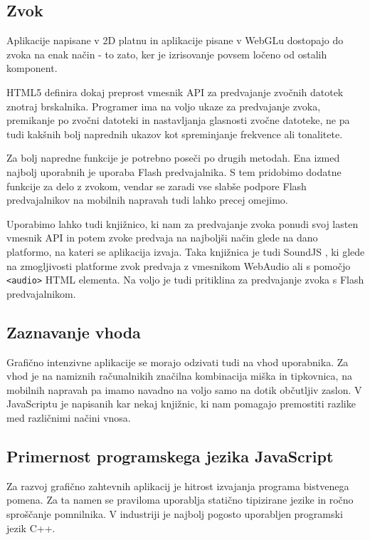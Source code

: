 \subsection{Zvok}

Aplikacije napisane v 2D platnu in aplikacije pisane v WebGLu dostopajo do zvoka na enak način - to zato, ker je izrisovanje povsem ločeno od ostalih komponent.

HTML5 definira dokaj preprost vmesnik API za predvajanje zvočnih datotek znotraj brskalnika. Programer ima na voljo ukaze za predvajanje zvoka, premikanje po zvočni datoteki in nastavljanja glasnosti zvočne datoteke, ne pa tudi kakšnih bolj naprednih ukazov kot spreminjanje frekvence ali tonalitete.

Za bolj napredne funkcije je potrebno poseči po drugih metodah. Ena izmed najbolj uporabnih je uporaba Flash predvajalnika. S tem pridobimo dodatne funkcije za delo z zvokom, vendar se zaradi vse slabše podpore Flash predvajalnikov na mobilnih napravah tudi lahko precej omejimo. 

Uporabimo lahko tudi knjižnico, ki nam za predvajanje zvoka ponudi svoj lasten vmesnik API in potem zvoke predvaja na najboljši način glede na dano platformo, na kateri se aplikacija izvaja. Taka knjižnica je tudi SoundJS \cite{soundjs}, ki glede na zmogljivosti platforme zvok predvaja z vmesnikom WebAudio ali s pomočjo \texttt{<audio>} HTML elementa. Na voljo je tudi pritiklina za predvajanje zvoka s Flash predvajalnikom.
 
\subsection{Zaznavanje vhoda}

Grafično intenzivne aplikacije se morajo odzivati tudi na vhod uporabnika. Za vhod je na namiznih računalnikih značilna kombinacija miška in tipkovnica, na mobilnih napravah pa imamo navadno na voljo samo na dotik občutljiv zaslon. V JavaScriptu je napisanih kar nekaj knjižnic, ki nam pomagajo premostiti razlike med različnimi načini vnosa.

\subsection{Primernost programskega jezika JavaScript}

Za razvoj grafično zahtevnih aplikacij je hitrost izvajanja programa bistvenega pomena. Za ta namen se praviloma uporablja statično tipizirane jezike in ročno sproščanje pomnilnika. V industriji je najbolj pogosto uporabljen programski jezik C++.

